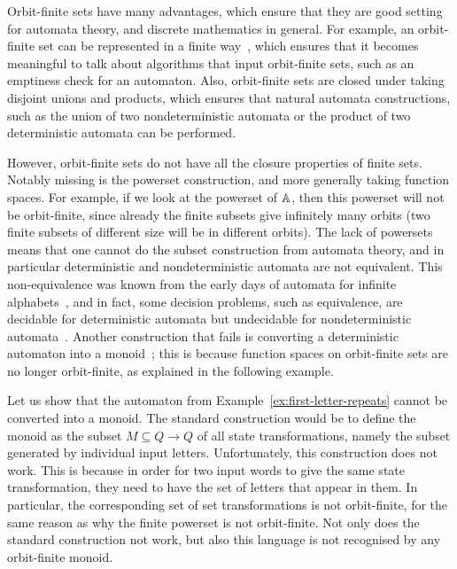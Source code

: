 Orbit-finite sets have many advantages, which ensure that they are good setting for automata theory, and discrete mathematics in general. For example, an orbit-finite set can be represented in a finite way~\cite{bojanczyk_slightly2018}, which ensures that it becomes meaningful to talk about algorithms that input orbit-finite sets, such as an emptiness check for an automaton. Also, orbit-finite sets are closed under taking disjoint unions and products, which ensures that natural automata constructions, such as the union of two nondeterministic automata or the product of two deterministic automata can be performed.

However, orbit-finite sets do not have all the closure properties of finite sets. Notably missing is the powerset construction, and more generally taking function spaces. For example, if we look at the powerset of $\mathbb A$, then this powerset will not be orbit-finite, since already the finite subsets give infinitely many orbits (two finite subsets of different size will be in different orbits). The lack of powersets means that one cannot do the subset construction from automata theory, and in particular deterministic and nondeterministic automata are not equivalent. This non-equivalence was known from the early days of automata for infinite alphabets~\cite{kaminskiFiniteMemoryAutomata1994}, and in fact, some decision problems, such as equivalence, are decidable for deterministic automata but undecidable for nondeterministic automata~\cite{nevenFiniteStateMachines2004}. Another construction that fails is converting a deterministic automaton into a monoid~\cite[p.~221]{bojanczykNominalMonoids2013}; this is because function spaces on orbit-finite sets are no longer orbit-finite, as explained in the following example. 

\begin{example}\label{ex:first-letter-repeats-monoid}
    Let us show that the  automaton from Example~\ref{ex:first-letter-repeats} cannot be converted into a monoid. The standard construction would be to define the monoid as the subset $M \subseteq Q \to Q$ of all state transformations, namely the subset generated by individual input letters. 
    Unfortunately, this construction does not work. This is because in order  for  two input words to give the same state transformation, they need to have the set of letters that appear in them. In particular, the corresponding set of set transformations is not orbit-finite, for the same reason as why the finite powerset is not orbit-finite. Not only does the standard construction not work, but also this language is not recognised by any orbit-finite monoid.
\end{example}



